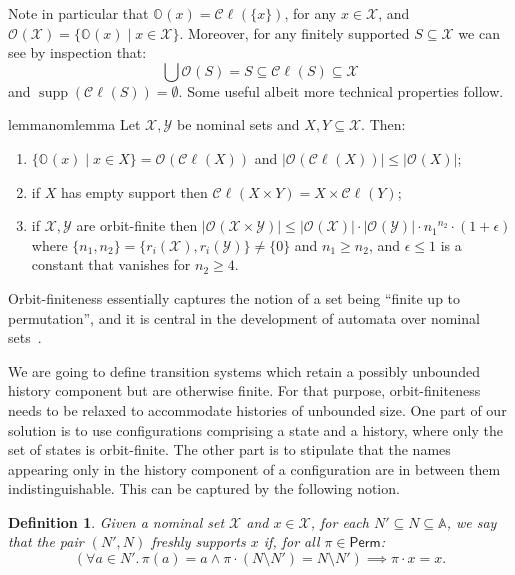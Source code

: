 \documentclass[10pt,a4paper]{article}
\newtheorem{definition}[theorem]{Definition}
\theoremstyle{definition}
\theoremstyle{remark}
\newcommand\regindex[0]{r_i}
\DeclareMathOperator{\supp}{supp}
\newcommand\Xcal{\mathcal{X}}
\newcommand\Ycal{\mathcal{Y}}
\newcommand\Atoms{\mathbb{A}}
\newcommand\orb[1][]{\mathcal{O}_{#1}}
\newcommand\orbs[1][]{\mathbb{O}_{#1}}
\newcommand\cls[1]{\mathcal{C}\!\ell_{#1}}
\renewcommand\S{N}
\newcommand\Perm[0]{{\mathsf{Perm}}}
\begin{document}
Note in particular that
$\orbs(x)=\cls{}(\{x\})$, for any $x\in\Xcal$, and
$\orb(\Xcal) = \{ \orbs(x) \mid x \in \Xcal\}$.
Moreover, for any finitely supported $S\subseteq\Xcal$ we can see by inspection that:
\[\bigcup\orb(S)=S\subseteq\cls{}(S)\subseteq\Xcal
  \]
and $\supp(\cls{}(S))=\emptyset$. Some useful albeit more technical properties follow.

\begin{restatable}{lemma}{nomlemma}\label{lem:nomlemma}
	Let $\Xcal,\Ycal$ be nominal sets and $X,Y \subseteq \Xcal$. 
	Then:
	\begin{enumerate}
		\item\label{nomlemma:orbs} $\{\orbs(x) \mid x \in X\} = \orb(\cls{}(X))$ and $|\orb(\cls{}(X))| \le |\orb(X)|$;
		\item\label{nomlemma:cls} if $X$ has empty support then $\cls{}(X \times Y) = X \times \cls{}(Y)$;
		\item\label{nomlemma:prod} if $\Xcal,\Ycal$ are orbit-finite then
		$|\orb(\Xcal \times \Ycal)| \le |\orb(\Xcal)|\cdot|\orb(\Ycal)|\cdot {n_1}^{n_2}\cdot(1 + \epsilon)$ where $\{n_1,n_2\}=\{\regindex(\Xcal), \regindex(\Ycal)\}\neq\{0\}$ and $n_1\geq n_2$,
		and $\epsilon\leq 1$ is a constant that vanishes for $n_2\geq 4$. 
	\end{enumerate}
\end{restatable}
\vspace{1em}


Orbit-finiteness essentially captures the notion of a set being ``finite up to permutation'', and it is central in the development of automata over nominal sets~\cite{automatanominalsets}.

We are going to define transition systems which retain a possibly unbounded history component but are otherwise finite. For that purpose, orbit-finiteness needs to be relaxed to accommodate histories of unbounded size. One part of our solution is to use configurations comprising a state and a history, where only the set of states is orbit-finite. The other part is to stipulate that the names appearing only in the history component of a configuration are in between them indistinguishable. This can be captured by the following notion.

\begin{definition}
  Given a nominal set $\Xcal$ and $x\in\Xcal$, for each $\S'\subseteq\S\subseteq\Atoms$, we say that the pair \emph{$(\S',\S)$ freshly supports $x$} if, for all $\pi\in\Perm$:
  \[ (\forall a\in\S'.\,\pi(a)=a\land\pi\cdot (\S\setminus\S')=\S\setminus\S')
    \implies \pi\cdot x=x.
  \]
\end{definition}
\end{document}
